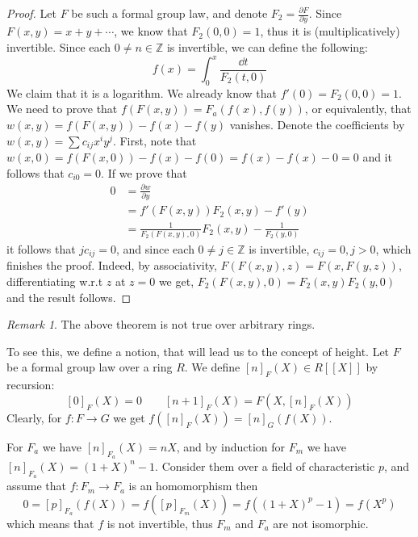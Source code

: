\documentclass{article}
\theoremstyle{definition}
\theoremstyle{remark}
\newtheorem*{remark*}{Remark}
\begin{document}
	\begin{proof}
		Let $F$ be such a formal group law, and denote $F_2 = \frac{\partial F}{\partial y}$.
		Since $F\left(x,y\right) = x+y+\cdots$, we know that $F_2\left(0,0\right) = 1$, thus it is (multiplicatively) invertible.
		Since each $0 \neq n \in \mathbb{Z}$ is invertible, we can define the following:
		$$ f\left(x\right) = \int_0^x \frac{\dd{t}}{F_2\left(t,0\right)} $$
		We claim that it is a logarithm.
		We already know that $f'\left(0\right) = F_2\left(0,0\right) = 1$.
		We need to prove that
		$f\left(F\left(x,y\right)\right) = F_a\left(f\left(x\right),f\left(y\right)\right)$,
		or equivalently, that
		$w\left(x,y\right) = f\left(F\left(x,y\right)\right) - f\left(x\right) - f\left(y\right)$ vanishes.
		Denote the coefficients by $w\left(x,y\right) = \sum c_{ij} x^i y^j$.
		First, note that
		$
			w\left(x,0\right)
			= f\left(F\left(x,0\right)\right) - f\left(x\right) - f\left(0\right)
			= f\left(x\right) - f\left(x\right) - 0
			= 0
		$
		and it follows that $c_{i0} = 0$.
		If we prove that
		\begin{align*}
			0
			&= \frac{\partial w}{\partial y}\\
			&= f'\left(F\left(x,y\right)\right) F_2\left(x,y\right) - f'\left(y\right)\\
			&= \frac{1}{F_2\left(F\left(x,y\right),0\right)} F_2\left(x,y\right) - \frac{1}{F_2\left(y,0\right)}
		\end{align*}
		it follows that $j c_{ij} = 0$, and since each $0 \neq j \in \mathbb{Z}$ is invertible, $c_{ij} = 0, j > 0$, which finishes the proof.
		Indeed, by associativity,
		$F\left(F\left(x,y\right),z\right)=F\left(x,F\left(y,z\right)\right)$, differentiating w.r.t $z$ at $z=0$ we get,
		$
			F_2\left(F\left(x,y\right),0\right)
			= F_2\left(x,y\right) F_2\left(y,0\right)
		$
		and the result follows.
	\end{proof}

	\begin{remark*}
		The above theorem is not true over arbitrary rings.
		
		To see this, we define a notion, that will lead us to the concept of height.
		Let $F$ be a formal group law over a ring $R$. We define $\left[n\right]_F \left(X\right) \in R\left[\left[X\right]\right]$ by recursion:
		$$
			\left[0\right]_F \left(X\right) = 0
			\qquad
			\left[n+1\right]_F \left(X\right) = F\left(X, \left[n\right]_F \left(X\right)\right)
		$$
		Clearly, for $f: F \to G$ we get
		$
			f\left(\left[n\right]_F \left(X\right)\right)
			=
			\left[n\right]_G \left(f\left(X\right)\right)
		$.
		
		For $F_a$ we have $\left[n\right]_{F_a} \left(X\right) = nX$,
		and by induction for $F_m$ we have $\left[n\right]_{F_a} \left(X\right) = \left(1+X\right)^n - 1$.
		Consider them over a field of characteristic $p$, and assume that $f: F_m \to F_a$ is an homomorphism then
		$$
			0
			=
			\left[p\right]_{F_a} \left(f\left(X\right)\right)
			=
			f\left(\left[p\right]_{F_m} \left(X\right)\right)
			=
			f\left(\left(1+X\right)^p-1\right)
			=
			f\left(X^p\right)
		$$
		which means that $f$ is not invertible, thus $F_m$ and $F_a$ are not isomorphic.
	\end{remark*}
\end{document}
